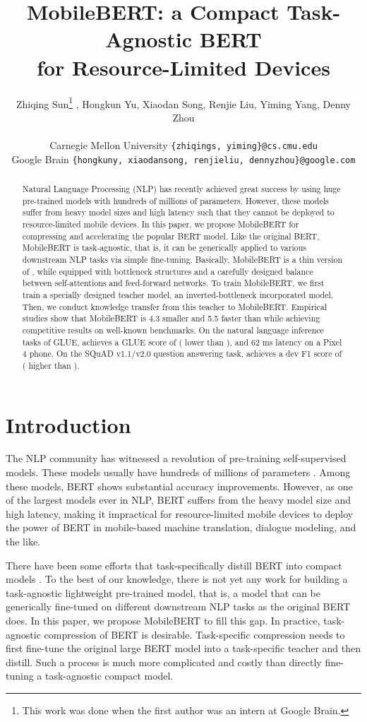 \documentclass[11pt,a4paper]{article}
\title{MobileBERT: a Compact Task-Agnostic BERT \\ for Resource-Limited Devices}
\author{
Zhiqing Sun\thanks{This work was done when the first author was an intern at Google Brain.} ,
Hongkun Yu,
Xiaodan Song,
Renjie Liu,
Yiming Yang,
Denny Zhou\\
\\
Carnegie Mellon University \texttt{\{zhiqings, yiming\}@cs.cmu.edu}\\
Google Brain \texttt{\{hongkuny, xiaodansong, renjieliu, dennyzhou\}@google.com}\\
}
\date{}
\begin{document}
\maketitle
\begin{abstract}
	Natural Language Processing (NLP) has recently achieved great success by using huge pre-trained models with hundreds of millions of parameters. However, these models suffer from  heavy model sizes and high latency such that they cannot be deployed to resource-limited mobile devices. In this paper, we propose MobileBERT for compressing and accelerating the popular BERT model. Like the original BERT, MobileBERT is task-agnostic, that is, it can be generically applied to various downstream NLP tasks via simple fine-tuning. Basically, MobileBERT is a thin version of , while equipped with bottleneck structures and a carefully designed balance between self-attentions and feed-forward networks. To train MobileBERT, we first train a specially designed teacher model, an inverted-bottleneck incorporated  model. Then, we conduct knowledge transfer from this  teacher to MobileBERT. Empirical studies show that MobileBERT is 4.3 smaller and 5.5 faster than   while achieving competitive results on well-known benchmarks.
	On the natural language inference tasks of GLUE,  achieves a GLUE score of   ( lower than ), 
	and 62 ms latency on a Pixel 4 phone. On the SQuAD v1.1/v2.0 question answering task,  achieves a dev F1 score of   ( higher than ). 
	
\end{abstract}

\section{Introduction}

The NLP community has witnessed a revolution of pre-training self-supervised models. These models usually have hundreds of millions of parameters \citep{peters2018deep,radford2018improving,devlin2018bert, radford2019language,yang2019xlnet}.
Among these models, BERT \citep{devlin2018bert} shows substantial accuracy improvements.
However, as one of the largest models ever in NLP, BERT suffers from the heavy model size and high latency, making it impractical for resource-limited mobile devices to deploy the power of BERT in mobile-based machine translation, dialogue modeling, and the like.



There have been some efforts that task-specifically distill BERT into compact models  \citep{turc2019well,tang2019distilling,sun2019patient,tsai2019small}. To the best of our knowledge,  there is not yet any work for building a task-agnostic lightweight pre-trained model, that is, a model that can be generically fine-tuned on different downstream NLP tasks as the original BERT does. In this paper, we propose MobileBERT to fill this gap.  In practice,  task-agnostic compression of BERT is desirable.  Task-specific compression needs to first fine-tune the original large BERT model into a task-specific teacher and then distill. Such a process is much more complicated \citep{wu2019conditional} and costly than directly fine-tuning a task-agnostic compact model. 
\end{document}
